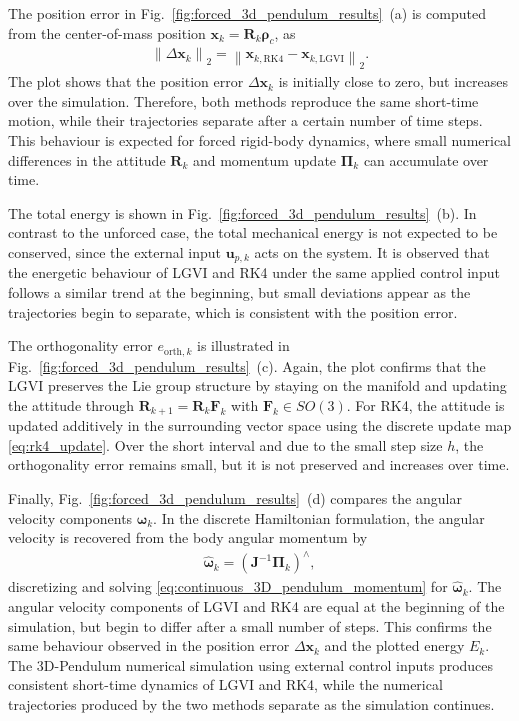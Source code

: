 The position error in Fig.~\ref{fig:forced_3d_pendulum_results}~(a) is computed
from the center-of-mass position $\bm{x}_k=\bm{R}_k\bm{\rho}_c$,
as
\begin{align}
    \left\|\Delta \bm{x}_k\right\|_2
    =
    \left\|
        \bm{x}_{k,\mathrm{RK4}}
        -
        \bm{x}_{k,\mathrm{LGVI}}
    \right\|_2 .
\end{align}
The plot shows that the position error $\Delta \bm{x}_k$ is initially close to zero, but increases
over the simulation. Therefore, both methods reproduce the same short-time motion,
while their trajectories separate after a certain number of time steps. This behaviour is
expected for forced rigid-body dynamics, where small numerical
differences in the attitude $\bm{R}_k$ and momentum update $\bm{\Pi}_k$ can accumulate over time.

The total energy is shown in Fig.~\ref{fig:forced_3d_pendulum_results}~(b).
In contrast to the unforced case, the total mechanical energy is not expected to be
conserved, since the external input $\bm{u}_{p,k}$ acts on the system. It is observed that
the energetic behaviour of LGVI and RK4 under the same applied control
input follows a similar trend at the beginning, but small deviations
appear as the trajectories begin to separate, which is consistent with the position error.

The orthogonality error $e_{\mathrm{orth},k}$ is illustrated in Fig.~\ref{fig:forced_3d_pendulum_results}~(c).
Again, the plot confirms that the LGVI preserves the Lie group structure by staying on the manifold and updating the attitude through
$\bm{R}_{k+1}=\bm{R}_k\bm{F}_k$ with $\bm{F}_k\in SO(3)$. For RK4, the attitude is
updated additively in the surrounding vector space using the discrete update map \eqref{eq:rk4_update}. Over the short interval and due
to the small step size $h$, the orthogonality error remains small, but it is not preserved and increases over time.

Finally, Fig.~\ref{fig:forced_3d_pendulum_results}~(d) compares the angular
velocity components $\bm{\omega}_k$. In the discrete Hamiltonian formulation, the angular velocity
is recovered from the body angular momentum by
\begin{align}
    \hat{\bm{\omega}}_k
    =
    (\bm{J}^{-1}\bm{\Pi}_k)^\wedge,
\end{align}
discretizing and solving \eqref{eq:continuous_3D_pendulum_momentum} for $\hat{\bm{\omega}}_k$.
The angular velocity components of LGVI and RK4 are equal at the beginning of the
simulation, but begin to differ after a small number of steps. This confirms the
same behaviour observed in the position error $\Delta \bm{x}_k$ and the plotted energy $E_k$.
The 3D-Pendulum numerical simulation using external control inputs produces
consistent short-time dynamics of LGVI and RK4, while the numerical trajectories produced by the two methods separate as the
simulation continues.


